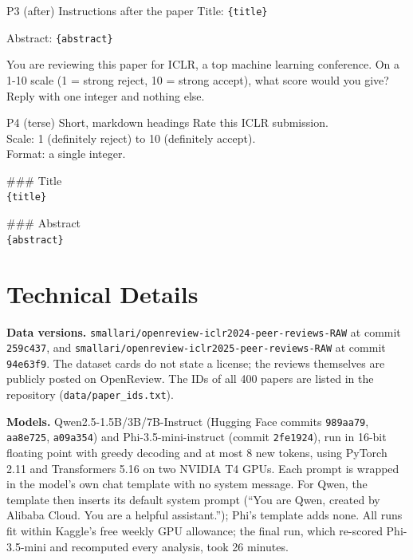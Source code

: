 \documentclass[11pt]{article}
\newcommand{\slot}[1]{\textcolor{blue!55!black}{\texttt{\{#1\}}}}
\begin{document}
\begin{promptbox}{P3 (after) \hfill\normalfont\small Instructions after the paper}
Title: \slot{title}\par
Abstract: \slot{abstract}\par
You are reviewing this paper for ICLR, a top machine learning conference. On a 1-10 scale (1 = strong reject, 10 = strong accept), what score would you give? Reply with one integer and nothing else.
\end{promptbox}

\begin{promptbox}{P4 (terse) \hfill\normalfont\small Short, markdown headings}
Rate this ICLR submission.\\
Scale: 1 (definitely reject) to 10 (definitely accept).\\
Format: a single integer.\par
\#\#\# Title\\
\slot{title}\par
\#\#\# Abstract\\
\slot{abstract}
\end{promptbox}

\section{Technical Details}
\label{app:details}

{\sloppy \textbf{Data versions.} \texttt{smallari/\allowbreak openreview-\allowbreak iclr2024-\allowbreak peer-\allowbreak reviews-\allowbreak RAW} at commit \texttt{259c437}, and \texttt{smallari/\allowbreak openreview-\allowbreak iclr2025-\allowbreak peer-\allowbreak reviews-\allowbreak RAW} at commit \texttt{94e63f9}. The dataset cards do not state a license; the reviews themselves are publicly posted on OpenReview. The IDs of all 400 papers are listed in the repository (\texttt{data/paper\_ids.txt}).\par}

\textbf{Models.} Qwen2.5-1.5B/3B/7B-Instruct (Hugging Face commits \texttt{989aa79}, \texttt{aa8e725}, \texttt{a09a354}) and Phi-3.5-mini-instruct (commit \texttt{2fe1924}), run in 16-bit floating point with greedy decoding and at most 8 new tokens, using PyTorch 2.11 and Transformers 5.16 on two NVIDIA T4 GPUs. Each prompt is wrapped in the model's own chat template with no system message. For Qwen, the template then inserts its default system prompt (``You are Qwen, created by Alibaba Cloud. You are a helpful assistant.''); Phi's template adds none. All runs fit within Kaggle's free weekly GPU allowance; the final run, which re-scored Phi-3.5-mini and recomputed every analysis, took 26 minutes.
\end{document}

